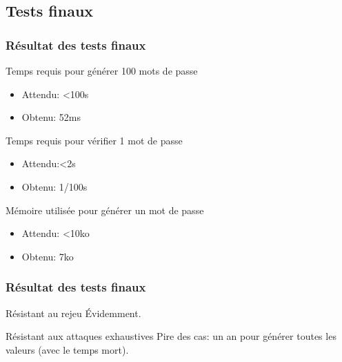 \documentclass[xcolor=table]{beamer}
\begin{document}
\subsection{Tests finaux}
\begin{frame}
\frametitle{Résultat des tests finaux}
\begin{block}{Temps requis pour générer 100 mots de passe}
\begin{itemize}
\item Attendu: \textless  100s
\item Obtenu: 52ms
\end{itemize}
\end{block}
\begin{block}{Temps requis pour vérifier 1 mot de passe}
\begin{itemize}
\item Attendu:\textless  2s
\item Obtenu: 1/100s
\end{itemize}
\end{block}
\begin{block}{Mémoire utilisée pour générer un mot de passe}
\begin{itemize}
\item Attendu: \textless  10ko
\item Obtenu: 7ko
\end{itemize}
\end{block}

\end{frame}

\begin{frame}
\frametitle{Résultat des tests finaux}
\begin{block}{Résistant au rejeu}
Évidemment.
\end{block}
\begin{block}{Résistant aux attaques exhaustives}
Pire des cas: un an pour générer toutes les valeurs (avec le temps mort).
\end{block}


\end{frame}
\end{document}

